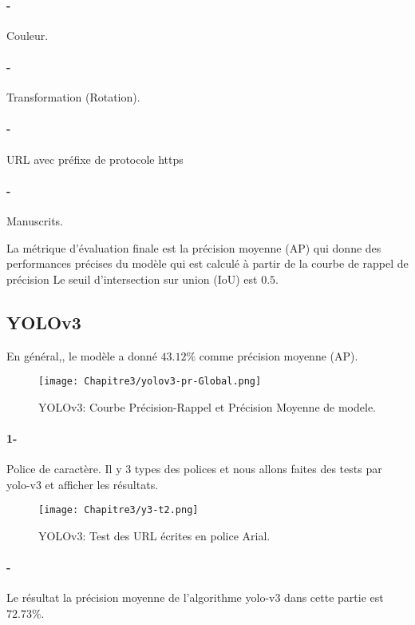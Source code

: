      \paragraph{-} Couleur.
     \paragraph{-} Transformation (Rotation).
     \paragraph{-} URL avec préfixe de protocole https
     \paragraph{-} Manuscrits.
     
     La métrique d'évaluation finale est la précision moyenne (AP) qui donne des performances précises du modèle qui est calculé à partir de la courbe de rappel de précision
     Le seuil d'intersection sur union (IoU) est $0.5$.

     \subsection{YOLOv3}
     En général,, le modèle a donné $43.12\%$ comme précision moyenne (AP). 
      \begin{figure}[H]
               \centering
                \texttt{[image: Chapitre3/yolov3-pr-Global.png]}
                \caption{YOLOv3: Courbe Précision-Rappel et Précision Moyenne de modele.}
                \label{y3_t0}
                \end{figure}

      \paragraph{1-} Police de caractère.
         Il y  3 types des polices  et nous allons faites des tests par yolo-v3 et afficher les résultats.
      \begin{figure}[H]
              \centering
               \texttt{[image: Chapitre3/y3-t2.png]}
               \caption{YOLOv3: Test des URL écrites en police Arial.}
               \label{y3_t1}
               \end{figure}
       
      \paragraph{-}Le résultat 
      la précision moyenne de l'algorithme yolo-v3 dans cette partie est $72.73\%$.

